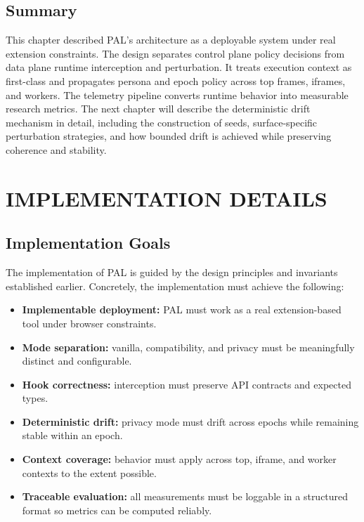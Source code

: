 \documentclass[11pt]{report}
\begin{document}
\section{Summary}

This chapter described PAL’s architecture as a deployable system under real extension constraints. The design separates control plane policy decisions from data plane runtime interception and perturbation. It treats execution context as first-class and propagates persona and epoch policy across top frames, iframes, and workers. The telemetry pipeline converts runtime behavior into measurable research metrics. The next chapter will describe the deterministic drift mechanism in detail, including the construction of seeds, surface-specific perturbation strategies, and how bounded drift is achieved while preserving coherence and stability.








\chapter{IMPLEMENTATION DETAILS}

\section{Implementation Goals}

The implementation of PAL is guided by the design principles and invariants established earlier. Concretely, the implementation must achieve the following:

\begin{itemize}
    \item \textbf{Implementable deployment:} PAL must work as a real extension-based tool under browser constraints.
    \item \textbf{Mode separation:} vanilla, compatibility, and privacy must be meaningfully distinct and configurable.
    \item \textbf{Hook correctness:} interception must preserve API contracts and expected types.
    \item \textbf{Deterministic drift:} privacy mode must drift across epochs while remaining stable within an epoch.
    \item \textbf{Context coverage:} behavior must apply across top, iframe, and worker contexts to the extent possible.
    \item \textbf{Traceable evaluation:} all measurements must be loggable in a structured format so metrics can be computed reliably.
\end{itemize}
\end{document}
